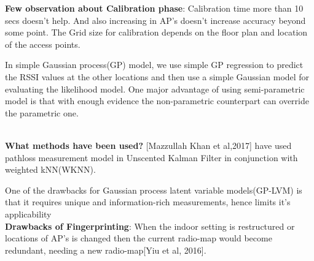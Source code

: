 \textbf{Few observation about Calibration phase}: Calibration time more than 10 secs doesn't help. And also increasing in AP's doesn't increase accuracy beyond some point. The Grid size for calibration depends on the floor plan and location of the access points. 

\noindent
In simple Gaussian process(GP) model, we use simple GP regression to predict the RSSI values at the other locations and then use a simple Gaussian model for evaluating the likelihood model. One major advantage of using semi-parametric model is that with enough evidence the non-parametric counterpart can override the parametric one\cite{richter}.



 \\



\textbf{What methods have been used?}
[Mazzullah Khan et al,2017] have used pathloss measurement model in Unscented Kalman Filter in conjunction with weighted kNN(WKNN).  




One of the drawbacks for Gaussian process latent variable models(GP-LVM) is that it requires unique and information-rich measurements, hence limits it's applicability  \\

\textbf{Drawbacks of Fingerprinting}: When the indoor setting is restructured or locations of AP's is changed then the current radio-map would become redundant, needing a new radio-map[Yiu et al, 2016].




